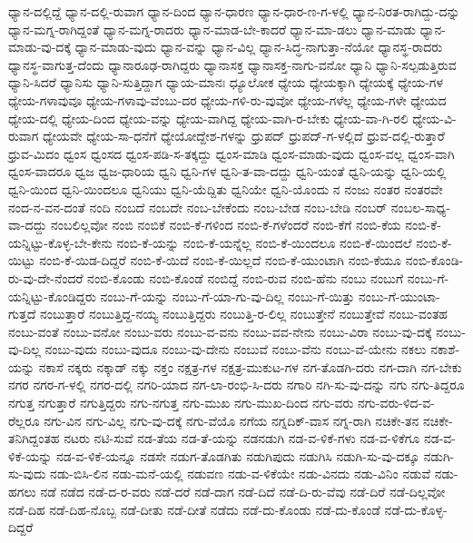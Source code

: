 ಧ್ಯಾನ-ದಲ್ಲಿದ್ದೆ
ಧ್ಯಾನ-ದಲ್ಲಿ-ರುವಾಗ
ಧ್ಯಾನ-ದಿಂದ
ಧ್ಯಾನ-ಧಾರಣ
ಧ್ಯಾನ-ಧಾರ-ಣ-ಗ-ಳಲ್ಲಿ
ಧ್ಯಾನ-ನಿರತ-ರಾಗಿದ್ದು-ದನ್ನು
ಧ್ಯಾನ-ಮಗ್ನ-ರಾಗಿದ್ದಂತೆ
ಧ್ಯಾನ-ಮಗ್ನ-ರಾದರು
ಧ್ಯಾನ-ಮಾಡ-ಬೇ-ಕಾದರೆ
ಧ್ಯಾನ-ಮಾ-ಡಲು
ಧ್ಯಾನ-ಮಾಡು
ಧ್ಯಾನ-ಮಾಡು-ವು-ದಕ್ಕೆ
ಧ್ಯಾನ-ಮಾಡು-ವುದು
ಧ್ಯಾನ-ವನ್ನು
ಧ್ಯಾನ-ವಿಲ್ಲ
ಧ್ಯಾನ-ಸಿದ್ಧ-ನಾಗುತ್ತಾ-ನೆಯೋ
ಧ್ಯಾನಸ್ಥ-ರಾದರು
ಧ್ಯಾನಸ್ಥ-ವಾಗುತ್ತ-ದೆಂದು
ಧ್ಯಾನಾರೂಢ-ರಾಗಿದ್ದರು
ಧ್ಯಾನಾಸಕ್ತ
ಧ್ಯಾನಾಸಕ್ತ-ನಾಗು-ವನೋ
ಧ್ಯಾನಿ
ಧ್ಯಾನಿ-ಸಲ್ಪಡುತ್ತಿರುವ
ಧ್ಯಾನಿ-ಸಿದರೆ
ಧ್ಯಾನಿಸು
ಧ್ಯಾನಿ-ಸುತ್ತಿದ್ದಾಗ
ಧ್ಯಾಯ-ಮಾನಃ
ಧ್ಯೂಲೋಕ
ಧ್ಯೇಯ
ಧ್ಯೇಯಕ್ಕಾಗಿ
ಧ್ಯೇಯಕ್ಕೆ
ಧ್ಯೇಯ-ಗಳ
ಧ್ಯೇಯ-ಗಳಾವುವೂ
ಧ್ಯೇಯ-ಗಳಾವು-ವೆಂಬು-ದರ
ಧ್ಯೇಯ-ಗಳಿ-ರು-ವುವೋ
ಧ್ಯೇಯ-ಗಳೆಲ್ಲ
ಧ್ಯೇಯ-ಗಳೇ
ಧ್ಯೇಯದ
ಧ್ಯೇಯ-ದಲ್ಲಿ
ಧ್ಯೇಯ-ದಿಂದ
ಧ್ಯೇಯ-ವನ್ನು
ಧ್ಯೇಯ-ವಾಗಿದ್ದ
ಧ್ಯೇಯ-ವಾಗಿ-ರ-ಬೇಕು
ಧ್ಯೇಯ-ವಾ-ಗಿ-ರಲಿ
ಧ್ಯೇಯ-ವಿ-ರುವಾಗ
ಧ್ಯೇಯವೇ
ಧ್ಯೇಯ-ಸಾ-ಧನೆಗೆ
ಧ್ಯೇಯೋದ್ದೇಶ-ಗಳನ್ನು
ಧ್ರುಪದ್
ಧ್ರುಪದ್‌-ಗ-ಳಲ್ಲಿದೆ
ಧ್ರುವ-ದಲ್ಲಿ-ರುತ್ತಾರೆ
ಧ್ರುವ-ಮಿದಂ
ಧ್ವಂಸ
ಧ್ವಂಸದ
ಧ್ವಂಸ-ಪಡಿ-ಸ-ತಕ್ಕದ್ದು
ಧ್ವಂಸ-ಮಾಡಿ
ಧ್ವಂಸ-ಮಾಡು-ವುದು
ಧ್ವಂಸ-ವಲ್ಲ
ಧ್ವಂಸ-ವಾಗಿ
ಧ್ವಂಸ-ವಾದರೂ
ಧ್ವಜ
ಧ್ವಜ-ಧಾರಿಯ
ಧ್ವನಿ
ಧ್ವನಿ-ಗಳ
ಧ್ವನಿ-ತ-ವಾ-ದದ್ದು
ಧ್ವನಿ-ಯಂತೆ
ಧ್ವನಿ-ಯನ್ನು
ಧ್ವನಿ-ಯಲ್ಲಿ
ಧ್ವನಿ-ಯಿಂದ
ಧ್ವನಿ-ಯಿಂದಲೂ
ಧ್ವನಿಯು
ಧ್ವನಿ-ಯೆದ್ದಿತು
ಧ್ವನಿಯೇ
ಧ್ವನಿ-ಯೊಂದು
ನ
ನಂಜು
ನಂತರ
ನಂತರವೇ
ನಂದ-ನ-ವನ-ದಂತೆ
ನಂದಿ
ನಂಬದೆ
ನಂಬದೇ
ನಂಬ-ಬೇಕೆಂದು
ನಂಬ-ಬೇಡ
ನಂಬ-ಬೇಡಿ
ನಂಬರ್‌
ನಂಬಲ-ಸಾಧ್ಯ-ವಾ-ದದ್ದು
ನಂಬಲಿಲ್ಲವೋ
ನಂಬಿ
ನಂಬಿಕೆ
ನಂಬಿ-ಕೆ-ಗಳಿಂದ
ನಂಬಿ-ಕೆ-ಗಳೆಂದರೆ
ನಂಬಿ-ಕೆಗೆ
ನಂಬಿ-ಕೆಯ
ನಂಬಿ-ಕೆ-ಯನ್ನಿಟ್ಟು-ಕೊಳ್ಳ-ಬೇ-ಕೇನು
ನಂಬಿ-ಕೆ-ಯನ್ನು
ನಂಬಿ-ಕೆ-ಯನ್ನೆಲ್ಲ
ನಂಬಿ-ಕೆ-ಯಿಂದಲೂ
ನಂಬಿ-ಕೆ-ಯಿಂದಲೆ
ನಂಬಿ-ಕೆ-ಯಿಟ್ಟು
ನಂಬಿ-ಕೆ-ಯಿಡ-ದಿದ್ದರೆ
ನಂಬಿ-ಕೆ-ಯಿದೆ
ನಂಬಿ-ಕೆ-ಯಿಲ್ಲದೆ
ನಂಬಿ-ಕೆ-ಯುಂಟಾಗಿ
ನಂಬಿ-ಕೆಯೂ
ನಂಬಿ-ಕೊಂಡಿ-ರು-ವು-ದೇ-ನೆಂದರೆ
ನಂಬಿ-ಕೊಂಡು
ನಂಬಿ-ಕೊಂಡೆ
ನಂಬಿದ್ದೆ
ನಂಬಿ-ರುವ
ನಂಬಿ-ಹೆನು
ನಂಬು
ನಂಬುಗೆ
ನಂಬು-ಗೆ-ಯನ್ನಿಟ್ಟು-ಕೊಂಡಿದ್ದರು
ನಂಬು-ಗೆ-ಯನ್ನು
ನಂಬು-ಗೆ-ಯಾ-ಗು-ವು-ದಿಲ್ಲ
ನಂಬು-ಗೆ-ಯಿತ್ತು
ನಂಬು-ಗೆ-ಯುಂಟಾ-ಗುತ್ತದೆ
ನಂಬುತ್ತಾರೆ
ನಂಬುತ್ತಿದ್ದ-ನಯ್ಯ
ನಂಬುತ್ತಿದ್ದರು
ನಂಬುತ್ತಿ-ರ-ಲಿಲ್ಲ
ನಂಬುತ್ತೇನೆ
ನಂಬುತ್ತೇವೆ
ನಂಬು-ವಂತಹ
ನಂಬು-ವಂತೆ
ನಂಬು-ವನೋ
ನಂಬು-ವರು
ನಂಬು-ವ-ವನು
ನಂಬು-ವವ-ನೇನು
ನಂಬು-ವಿರಾ
ನಂಬು-ವು-ದಕ್ಕೆ
ನಂಬು-ವು-ದಿಲ್ಲ
ನಂಬು-ವುದು
ನಂಬು-ವುದೂ
ನಂಬು-ವು-ದೇನು
ನಂಬುವೆ
ನಂಬು-ವೆನು
ನಂಬು-ವೆ-ಯೇನು
ನಕಲು
ನಕಾಶೆ-ಯನ್ನು
ನಕಾಸೆ
ನಕ್ಕರು
ನಕ್ಕಾಡ್
ನಕ್ಕು
ನಕ್ತಂ
ನಕ್ಷತ್ರ-ಗಳ
ನಕ್ಷತ್ರ-ಮುಕುಟ-ಗಳ
ನಗ-ತೊಡಗಿ-ದರು
ನಗ-ದಾಗಿ
ನಗ-ಬೇಕು
ನಗರ
ನಗರ-ಗ-ಳಲ್ಲಿ
ನಗರ-ದಲ್ಲಿ
ನಗರಿ-ಯಾದ
ನಗ-ಲಾ-ರಂಭಿ-ಸಿ-ದರು
ನಗಾರಿ
ನಗಿ-ಸು-ವು-ದನ್ನು
ನಗು
ನಗು-ತಿದ್ದರೂ
ನಗುತ್ತ
ನಗುತ್ತಾರೆ
ನಗುತ್ತಿದ್ದರು
ನಗು-ನಗುತ್ತ
ನಗು-ಮುಖ
ನಗು-ಮುಖ-ದಿಂದ
ನಗು-ವರು
ನಗು-ವರು-ಳಿದ-ವ-ರೆಲ್ಲರೂ
ನಗು-ವಿನ
ನಗು-ವಿಲ್ಲ
ನಗು-ವು-ದಕ್ಕೆ
ನಗು-ವೆಯೊ
ನಗೆಯ
ನಗ್ನದಿಕ್‌-ವಾಸ
ನಗ್ನ-ರಾಗಿ
ನಚಿಕೇ-ತನ
ನಚಿಕೇ-ತನಿಗಿದ್ದಂತಹ
ನಟರು
ನಟಿ-ಸುವೆ
ನಡ-ತೆಯ
ನಡ-ತೆ-ಯನ್ನು
ನಡನಡುಗಿ
ನಡ-ವ-ಳಿಕೆ-ಗಳು
ನಡ-ವ-ಳಿಕೆಗೂ
ನಡ-ವ-ಳಿಕೆ-ಯನ್ನು
ನಡ-ವ-ಳಿಕೆ-ಯನ್ನೂ
ನಡಸೇ
ನಡುಗ-ತೊಡಗಿತು
ನಡುಗಿಪುದು
ನಡುಗಿಸಿ
ನಡುಗಿ-ಸು-ವು-ದಕ್ಕೂ
ನಡುಗಿ-ಸು-ವುದು
ನಡು-ಬಿಸಿ-ಲಿನ
ನಡು-ಮನೆ-ಯಲ್ಲಿ
ನಡುವಣ
ನಡು-ವ-ಳಿಕೆಯೇ
ನಡು-ವಿನದು
ನಡು-ವಿನಿಂ
ನಡುವೆ
ನಡು-ಹಗಲು
ನಡೆ
ನಡೆದ
ನಡೆ-ದ-ರ-ವರು
ನಡೆ-ದರೆ
ನಡೆ-ದಾಗ
ನಡೆ-ದಿದೆ
ನಡೆ-ದಿ-ರು-ವೆವು
ನಡೆ-ದಿರೆ
ನಡೆ-ದಿಲ್ಲವೋ
ನಡೆ-ದಿಹ
ನಡೆ-ದಿಹ-ನೊಬ್ಬ
ನಡೆ-ದೀತು
ನಡೆ-ದೀತೆ
ನಡೆದು
ನಡೆ-ದು-ಕೊಂಡು
ನಡೆ-ದು-ಕೊಂಡೆ
ನಡೆ-ದು-ಕೊಳ್ಳ-ದಿದ್ದರೆ
